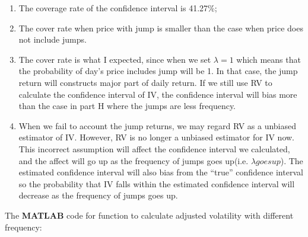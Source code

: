 \documentclass[12pt,letterpaper]{article}
\begin{document}
\begin{enumerate}[label=\textbf{(\Alph*)}]
\begin{figure}[H]
        \end{figure}
\begin{enumerate}[label=(\roman*)]
    \item The coverage rate of the confidence interval is 41.27\%;
    \item The cover rate when price with jump is smaller than the case when price does not include jumps.
    \item The cover rate is what I expected, since when we set $\lambda=1$ which means that the probability of day's price includes jump will be 1. In that case, the jump return will constructs major part of daily return. If we still use RV to calculate the confidence interval of IV, the confidence interval will bias more than the case in part H where the jumps are less frequency.
    \item When we fail to account the jump returns, we may regard RV as a unbiased estimator of IV. However, RV is no longer a unbiased estimator for IV now. This incorrect assumption will affect the confidence interval we calculated, and the affect will go up as the frequency of jumps goes up(i.e. $\lambda goes up$). The estimated confidence interval will also bias from the ``true'' confidence interval so the probability that IV falls within the estimated confidence interval will decrease as the frequency of jumps goes up.\\
    
\end{enumerate}



The \textbf{MATLAB} code for function to calculate adjusted volatility with different frequency:
   

  ~~\\


\end{enumerate}
\end{document}

